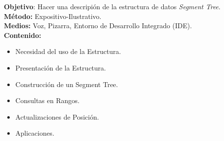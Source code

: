 \noindent \textbf{Objetivo}: Hacer una descripi\'on de la estructura de datos \textit{Segment Tree}.\\
\noindent \textbf{M\'etodo:} Expositivo-Ilustrativo.\\
\noindent \textbf{Medios:} Voz, Pizarra, Entorno de Desarrollo Integrado (IDE).\\

\noindent \textbf{Contenido:}\\
\begin{itemize}
    \item Necesidad del uso de la Estructura.
    \item Presentaci\'on de la Estructura.
    \item Construcci\'on de un Segment Tree.
    \item Consultas en Rangos.
    \item Actualizaciones de Posici\'on.
    \item Aplicaciones.
\end{itemize}
